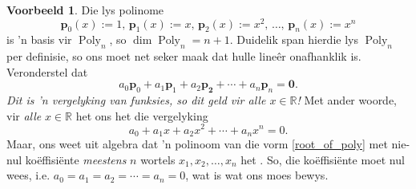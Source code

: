 \documentclass[a4paper,11pt]{book}
\theoremstyle{definition}
\newtheorem{example_environment}{Voorbeeld}[chapter]
\newcommand{\be}{\begin{equation}}
\newcommand{\ee}{\end{equation}}
\newcommand{\ve}[1]{\mathbf{#1}}
\newenvironment{example}
	{
		\begin{oframed}
		\begin{example_environment}
	}
	{
		\end{example_environment}
		\end{oframed}
	}
\DeclareMathOperator{\Poly}{Poly}
\begin{document}
\begin{example} Die lys polinome
	\[
		\ve{p}_0 (x) := 1, \, \ve{p}_1 (x) := x, \, \ve{p}_2 (x) := x^2, \,
		\ldots, \, \ve{p}_n (x) := x^n
	\]
	is 'n basis vir $\Poly_n$, so $\dim \Poly_n = n+1$. Duidelik span
	hierdie lys $\Poly_n$ per definisie, so ons moet net seker maak dat
	hulle line{\^er} onafhanklik is. Veronderstel dat
	\[
		a_0 \ve{p}_0 + a_1 \ve{p}_1 + a_2 \ve{p_2} + \cdots + a_n \ve{p}_n
		= \ve{0}.
	\]
	\emph{Dit is 'n vergelyking van funksies, so dit geld vir alle $x \in
	\mathbb{R}$!} Met ander woorde, vir \emph{alle} $x \in \mathbb{R}$ het
	ons het die vergelyking
	\be \label{root_of_poly}
	a_0 + a_1 x + a_2 x^2 + \cdots + a_n x^n = 0.
	\ee
	Maar, ons weet uit algebra dat 'n
	polinoom van die vorm \eqref{root_of_poly} met nie-nul
	ko{\"e}ffisi{\"e}nte \emph{meestens} $n$ wortels $x_1, x_2, \ldots,
	x_n$ het . So, die ko{\"e}ffisi{\"e}nte moet nul wees, i.e. $a_0 = a_1
	= a_2 = \cdots = a_n = 0$, wat is wat ons moes bewys.
\end{example}
\end{document}
